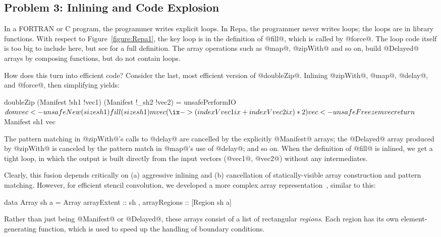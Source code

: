 \subsection{Problem 3: Inlining and Code Explosion}
\label{section:Explosion}

In a FORTRAN or C program, the programmer writes explicit loops. In Repa, the programmer never writes loops; the loops are in library functions. With respect to Figure~\ref{figure:Repa1}, the key loop is in the definition of @fill@, which is called by @force@. The loop code itself is too big to include here, but see \cite{Lippmeier:Stencil} for a full definition. The array operations such as @map@, @zipWith@ and so on, build @Delayed@ arrays by composing functions, but do not contain loops.

How does this turn into efficient code? Consider the last, most efficient version of @doubleZip@. Inlining @zipWith@, @map@, @delay@, and @force@, then simplifying yields:
\par
\begin{small}
\begin{code}
  doubleZip (Manifest !sh1 !vec1) (Manifest !_sh2 !vec2) 
   = unsafePerformIO 
   $ do mvec <- unsafeNew (size sh1) 
        fill (size sh1) mvec
          (\ix -> (indexV vec1 ix + indexV vec2 ix) * 2)
        vec <- unsafeFreeze mvec
        return $ Manifest sh1 vec
\end{code}
\end{small}
%
The pattern matching in @zipWith@'s calls to @delay@ are cancelled by the explicitly @Manifest@ arrays; the @Delayed@ array produced by @zipWith@ is canceled by the pattern match in @map@'s use of @delay@; and so on. When the definition of @fill@ is inlined, we get a tight loop, in which the output is built directly from the input vectors (@vec1@, @vec2@) without any intermediates.

Clearly, this fusion depends critically on (a) aggressive inlining and (b) cancellation of statically-visible array construction and pattern matching.  However, for efficient stencil convolution, we developed a more complex array representation~\cite{Lippmeier:Stencil}, similar to this:
\par
\begin{small}
\begin{code}
  data Array sh a 
    = Array { arrayExtent  :: sh
            , arrayRegions :: [Region sh a] }
\end{code}
\end{small}
%
Rather than just being @Manifest@ or @Delayed@, these arrays consist of a list of rectangular \emph{regions}. Each region has its own element-generating function, which is used to speed up the handling of boundary conditions.

